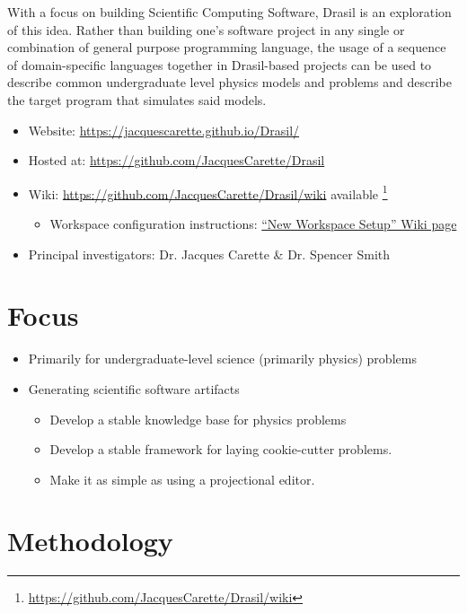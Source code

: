 With a focus on building Scientific Computing Software, Drasil is an exploration
of this idea. Rather than building one's software project in any single or
combination of general purpose programming language, the usage of a sequence of
domain-specific languages together in Drasil-based projects can be used to
describe common undergraduate level physics models and problems and describe the
target program that simulates said models.

\begin{itemize}
    \item Website: \url{https://jacquescarette.github.io/Drasil/}
    \item Hosted at: \url{https://github.com/JacquesCarette/Drasil}
    \item Wiki: \url{https://github.com/JacquesCarette/Drasil/wiki} available \footnote{\url{https://github.com/JacquesCarette/Drasil/wiki}}
          \begin{itemize}
              \item Workspace configuration instructions: \href{https://github.com/JacquesCarette/Drasil/wiki/New-Workspace-Setup}{``New Workspace Setup'' Wiki page}
          \end{itemize}
    \item Principal investigators: Dr. Jacques Carette \& Dr. Spencer Smith
\end{itemize}

\section{Focus}

\begin{itemize}
    \item Primarily for undergraduate-level science (primarily physics) problems
    \item Generating scientific software artifacts
          \begin{itemize}
              \item Develop a stable knowledge base for physics problems
              \item Develop a stable framework for laying cookie-cutter problems.
              \item Make it as simple as using a projectional editor.
          \end{itemize}
\end{itemize}

\section{Methodology}

